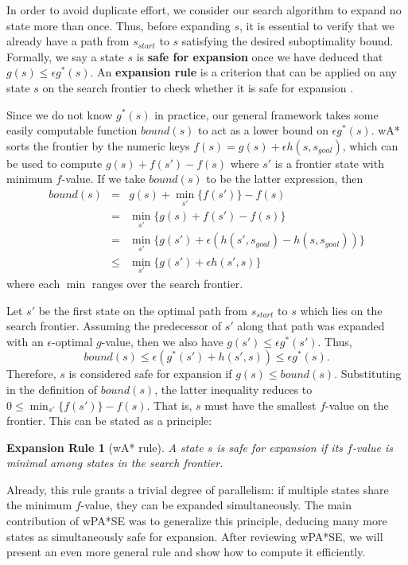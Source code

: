 \documentclass[letterpaper]{article}
\newtheorem{rul}{Expansion Rule}
\begin{document}
In order to avoid duplicate effort, we consider our search algorithm to expand no state more than once. Thus, before expanding $s$, it is essential to verify that we already have a path from $s_{start}$ to $s$ satisfying the desired suboptimality bound. Formally, we say a state $s$ is \textbf{safe for expansion} once we have deduced that $g(s) \le \epsilon g^*(s)$. An \textbf{expansion rule} is a criterion that can be applied on any state $s$ on the search frontier to check whether it is safe for expansion .

Since we do not know $g^*(s)$ in practice, our general framework takes some easily computable function $bound(s)$ to act as a lower bound on $\epsilon g^*(s)$. wA* sorts the frontier by the numeric keys $f(s) = g(s) + \epsilon h(s,s_{goal})$, which can be used to compute $g(s) + f(s') - f(s)$ where $s'$ is a frontier state with minimum $f$-value. If we take $bound(s)$ to be the latter expression, then
\begin{eqnarray*}
bound(s) &=& g(s) + \min_{s'}\{f(s')\} - f(s)
\\&=& \min_{s'}\{g(s) + f(s') - f(s)\}
\\&=& \min_{s'}\{g(s') + \epsilon\left(h(s',s_{goal}) - h(s,s_{goal})\right)\}
\\&\le& \min_{s'}\{g(s') + \epsilon h(s',s)\}
\end{eqnarray*}
where each $\min$ ranges over the search frontier.

Let $s'$ be the first state on the optimal path from $s_{start}$ to $s$ which lies on the search frontier. Assuming the predecessor of $s'$ along that path was expanded with an $\epsilon$-optimal $g$-value, then we also have $g(s') \le \epsilon g^*(s')$. Thus,
\[bound(s) \le \epsilon (g^*(s') + h(s',s)) \le \epsilon g^*(s).\]
Therefore, $s$ is considered safe for expansion if $g(s) \le bound(s)$. Substituting in the definition of $bound(s)$, the latter inequality reduces to $0 \le \min_{s'}\{f(s')\} - f(s)$. That is, $s$ must have the smallest $f$-value on the frontier. This can be stated as a principle:

\begin{rul}[wA* rule]
A state $s$ is safe for expansion if its $f$-value is minimal among states in the search frontier.
\end{rul}

Already, this rule grants a trivial degree of parallelism: if multiple states share the minimum $f$-value, they can be expanded simultaneously. The main contribution of wPA*SE was to generalize this principle, deducing many more states as simultaneously safe for expansion. After reviewing wPA*SE, we will present an even more general rule and show how to compute it efficiently.
\end{document}
